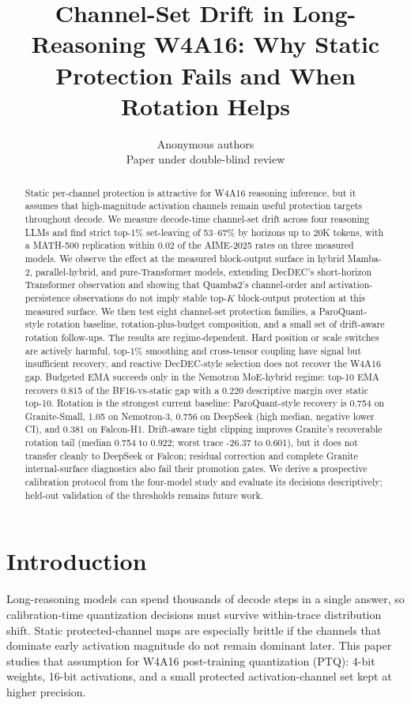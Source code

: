 \documentclass{article}
\title{Channel-Set Drift in Long-Reasoning W4A16: Why Static Protection Fails and When Rotation Helps}
\author{Anonymous authors\\Paper under double-blind review}
\begin{document}
\maketitle

\begin{abstract}
Static per-channel protection is attractive for W4A16 reasoning inference, but it assumes that high-magnitude activation channels remain useful protection targets throughout decode. We measure decode-time channel-set drift across four reasoning LLMs and find strict top-1\% set-leaving of 53--67\% by horizons up to 20K tokens, with a MATH-500 replication within 0.02 of the AIME-2025 rates on three measured models. We observe the effect at the measured block-output surface in hybrid Mamba-2, parallel-hybrid, and pure-Transformer models, extending DecDEC's short-horizon Transformer observation and showing that Quamba2's channel-order and activation-persistence observations do not imply stable top-$K$ block-output protection at this measured surface. We then test eight channel-set protection families, a ParoQuant-style rotation baseline, rotation-plus-budget composition, and a small set of drift-aware rotation follow-ups. The results are regime-dependent. Hard position or scale switches are actively harmful, top-1\% smoothing and cross-tensor coupling have signal but insufficient recovery, and reactive DecDEC-style selection does not recover the W4A16 gap. Budgeted EMA succeeds only in the Nemotron MoE-hybrid regime: top-10 EMA recovers 0.815 of the BF16-vs-static gap with a 0.220 descriptive margin over static top-10. Rotation is the strongest current baseline: ParoQuant-style recovery is 0.754 on Granite-Small, 1.05 on Nemotron-3, 0.756 on DeepSeek (high median, negative lower CI), and 0.381 on Falcon-H1. Drift-aware tight clipping improves Granite's recoverable rotation tail (median 0.754 to 0.922; worst trace -26.37 to 0.601), but it does not transfer cleanly to DeepSeek or Falcon; residual correction and complete Granite internal-surface diagnostics also fail their promotion gates. We derive a prospective calibration protocol from the four-model study and evaluate its decisions descriptively; held-out validation of the thresholds remains future work.
\end{abstract}

\section{Introduction}

Long-reasoning models can spend thousands of decode steps in a single answer, so calibration-time quantization decisions must survive within-trace distribution shift. Static protected-channel maps are especially brittle if the channels that dominate early activation magnitude do not remain dominant later. This paper studies that assumption for W4A16 post-training quantization (PTQ): 4-bit weights, 16-bit activations, and a small protected activation-channel set kept at higher precision.
\end{document}
